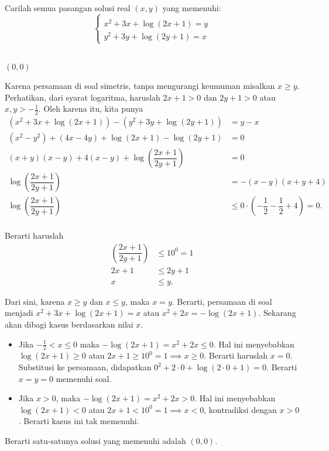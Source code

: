 \documentclass[11pt]{scrartcl}
\begin{document}
	\begin{soalbaru}
		Carilah semua pasangan solusi real $(x,y)$ yang memenuhi:\\[-10pt] 
				 		$$\begin{cases}\\[-30pt]
				 		x^2+3x+\log(2x+1)=y \\[-5pt]
				 		y^2+3y+\log(2y+1)=x
				 		\end{cases}$$\\[-10pt]
	
		\begin{jawaban}
		$(0,0)$
		\end{jawaban}
		\begin{solusi}
		Karena persamaan di soal simetris, tanpa mengurangi keumuman misalkan $x \ge y$.
		Perhatikan, dari syarat logaritma, haruslah $2x+1>0 $ dan $2y+1>0$ atau $x,y > -\frac12$. Oleh karena itu, kita punya 	
		\begin{equation*}
		\begin{split}
		(x^2+3x+\log(2x+1))-(y^2+3y+\log(2y+1))&=y-x\\
		(x^2-y^2)+(4x-4y)+\log(2x+1)-\log(2y+1)&=0\\
		(x+y)(x-y)+4(x-y)+\log\left(\dfrac{2x+1}{2y+1}\right)&=0\\
		  \log\left(\dfrac{2x+1}{2y+1}\right) &= -(x-y)(x+y+4) \\
		  \log\left(\dfrac{2x+1}{2y+1}\right)&\le 0\cdot(-\dfrac12-\dfrac12+4) = 0.\\
		\end{split}
		\end{equation*}
		
		Berarti haruslah
		\begin{equation*}
		\begin{split}
		\left(\dfrac{2x+1}{2y+1}\right)&\le 10^0 = 1\\
		2x+1 &\le 2y+1\\
		x &\le y.
		\end{split}
		\end{equation*}
		
		Dari sini, karena $x \ge y$ dan $x \le y$, maka $x=y$. Berarti, persamaan di soal menjadi $x^2+3x+\log(2x+1)=x$ atau $x^2+2x=-\log (2x+1)$.
		Sekarang akan dibagi kasus berdasarkan nilai $x$.
		
		\begin{itemize}
		\item Jika $ -\frac12 < x \le 0$ maka $-\log(2x+1)=x^2+2x \le 0$. Hal ini menyebabkan $\log(2x+1) \ge 0$ atau $2x+1 \ge 10^0=1 \implies x \ge 0$. Berarti haruslah $x=0$. Substitusi ke persamaan, didapatkan $0^2+2\cdot 0+\log(2\cdot 0+1)=0$. Berarti $x=y=0$ memenuhi soal.
		
		\item Jika $ x > 0$, maka $-\log(2x+1)=x^2+2x > 0$. Hal ini menyebabkan $\log(2x+1) < 0$ atau $2x+1 < 10^0=1 \implies x < 0$, kontradiksi dengan $x > 0$. Berarti kasus ini tak memenuhi.
		\end{itemize}
		Berarti satu-satunya solusi yang memenuhi adalah $(0,0)$.
		\end{solusi}
	\end{soalbaru}
	
\end{document}
